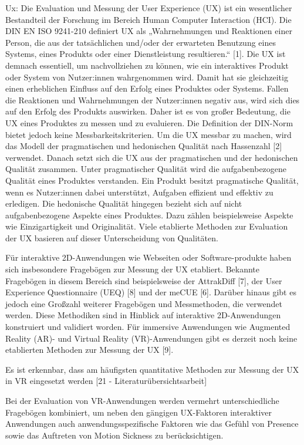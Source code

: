 Ux:
Die Evaluation und Messung der User Experience (UX) ist ein wesentlicher Bestandteil der Forschung im Bereich Human Computer Interaction (HCI). Die DIN EN ISO 9241-210 definiert UX als „Wahrnehmungen und Reaktionen einer Person, die aus der tatsächlichen und/oder der erwarteten Benutzung eines Systems, eines Produkts oder einer Dienstleistung resultieren.“ [1]. Die UX ist demnach essentiell, um nachvollziehen zu können, wie ein interaktives Produkt oder System von Nutzer:innen wahrgenommen wird. Damit hat sie gleichzeitig einen erheblichen Einfluss auf den Erfolg eines Produktes oder Systems. Fallen die Reaktionen und Wahrnehmungen der Nutzer:innen negativ aus, wird sich dies auf den Erfolg des Produkts auswirken. Daher ist es von großer Bedeutung, die UX eines Produktes zu messen und zu evaluieren. Die Definition der DIN-Norm bietet jedoch keine Messbarkeitskriterien. Um die UX messbar zu machen, wird das Modell der pragmatischen und hedonischen Qualität nach Hassenzahl [2] verwendet. Danach setzt sich die UX aus der pragmatischen und der hedonischen Qualität zusammen. Unter pragmatischer Qualität wird die aufgabenbezogene Qualität eines Produktes verstanden. Ein Produkt besitzt pragmatische Qualität, wenn es Nutzer:innen dabei unterstützt, Aufgaben effizient und effektiv zu erledigen. Die hedonische Qualität hingegen bezieht sich auf nicht aufgabenbezogene Aspekte eines Produktes. Dazu zählen beispielsweise Aspekte wie Einzigartigkeit und Originalität. Viele etablierte Methoden zur Evaluation der UX basieren auf dieser Unterscheidung von Qualitäten. 

Für interaktive 2D-Anwendungen wie Webseiten oder Software-produkte haben sich insbesondere Fragebögen zur Messung der UX etabliert. Bekannte Fragebögen in diesem Bereich sind beispielsweise der AttrakDiff [7], der User Experience Questionnaire (UEQ) [8] und der meCUE [6]. Darüber hinaus gibt es jedoch eine Großzahl weiterer Fragebögen und Messmethoden, die verwendet werden. Diese Methodiken sind in Hinblick auf interaktive 2D-Anwendungen konstruiert und validiert worden. Für immersive Anwendungen wie Augmented Reality (AR)- und Virtual Reality (VR)-Anwendungen gibt es derzeit noch keine etablierten Methoden zur Messung der UX [9].

Es ist erkennbar, dass am häufigsten quantitative Methoden zur Messung der UX in VR eingesetzt werden [21 - Literaturübersichtsarbeit]

Bei der Evaluation von VR-Anwendungen werden vermehrt unterschiedliche Fragebögen kombiniert, um neben den gängigen UX-Faktoren interaktiver Anwendungen auch anwendungsspezifische Faktoren wie das Gefühl von Presence sowie das Auftreten von Motion Sickness zu berücksichtigen.


